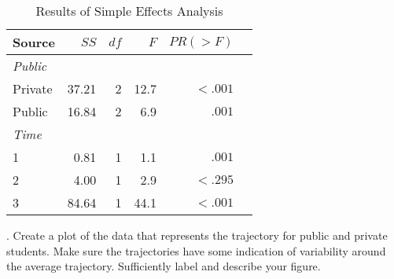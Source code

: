 \documentclass[onecolumn,10pt]{jhwhw}
\begin{document}
\begin{table}[h!]
\begin{center}
\begin{tabular}{l r r r r r}
\toprule
Source & $SS$ & $df$ & $F$ & $PR(>F)$ \\
\midrule
\it{Public} & & & & \\
\hspace{1em} Private     & 37.21 &  2  & 12.7 & $<.001$ \\
\hspace{1em} Public      & 16.84 &  2  &  6.9 & $ .001$ \\
\it{Time} & & & & \\
\hspace{1em} 1      &  0.81 &  1  &  1.1 & $ .001$\\
\hspace{1em} 2      &  4.00 &  1  &  2.9 & $<.295$\\
\hspace{1em} 3      & 84.64 &  1  & 44.1 & $<.001$\\
\bottomrule
\end{tabular}
\end{center}
\caption{Results of Simple Effects Analysis}
\end{table}

. Create a plot of the data that represents the trajectory for public and private students. Make sure the trajectories have some indication of variability around the average trajectory. Sufficiently label and describe your figure.
\end{document}
